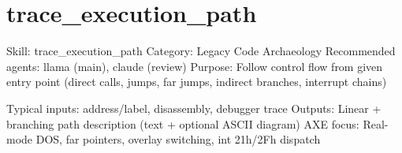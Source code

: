 \chapter{trace\+\_\+execution\+\_\+path }
\hypertarget{md_skills_2trace__execution__path}{}\label{md_skills_2trace__execution__path}
Skill\+: trace\+\_\+execution\+\_\+path Category\+: Legacy Code Archaeology Recommended agents\+: llama (main), claude (review) Purpose\+: Follow control flow from given entry point (direct calls, jumps, far jumps, indirect branches, interrupt chains)

Typical inputs\+:  address/label, disassembly, debugger trace Outputs\+: Linear + branching path description (text + optional ASCII diagram) AXE focus\+: Real-\/mode DOS, far pointers, overlay switching, int 21h/2\+Fh dispatch 